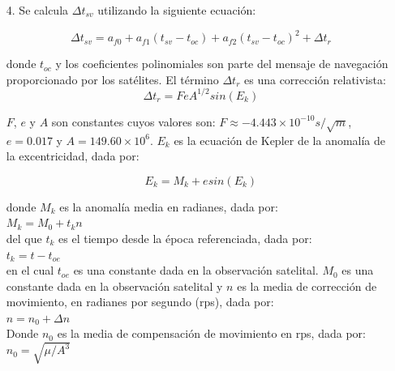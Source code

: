{\begin{itemize}
donde $c$ es la velocidad de la luz: $c \approx 2.998 \times 10^{8} ms^{-1}$.

\item[4.] Se calcula $\Delta t_{sv}$ utilizando la siguiente ecuación:

\begin{equation}
\label{Eq:Deltat_sv}
\Delta t_{sv}= a_{f0} + a_{f1}(t_{sv}-t_{oc}) + a_{f2}(t_{sv}-t_{oc})^2 + \Delta t_{r}
\end{equation}

donde $t_{oc}$ y los coeficientes polinomiales son parte del mensaje de navegación proporcionado por los satélites. El término $\Delta t_{r}$ es una corrección relativista:\\

\begin{equation}
\label{Eq:Deltat_r}
\Delta t_r = FeA^{1/2}sin(E_{k})
\end{equation}

$F$, $e$ y $A$ son constantes cuyos valores son: $F \approx -4.443 \times 10^{-10} s/\sqrt{m}$, $e = 0.017$ y $A = 149.60 \times 10^{6}$. $E_{k}$ es la ecuación de Kepler de la anomalía de la excentricidad, dada por:

\begin{equation}
\label{Eq:Kepler}
E_k = M_k + esin(E_k)
\end{equation}

donde $M_k$ es la anomalía media en radianes, dada por: \\

$M_k = M_0 + t_k n$\\

del que $t_k$ es el tiempo desde la época referenciada, dada por:\\

$t_k = t - t_{oe}$\\

en el cual $t_{oe}$ es una constante dada en la observación satelital. $M_0$ es una constante dada en la observación satelital y $n$ es la media de corrección de movimiento, en radianes por segundo (rps), dada por:\\

$n = n_0 + \Delta n$\\

Donde $n_0$ es la media de compensación de movimiento en rps, dada por:\\

$n_0 = \sqrt{\mu / A^{3}}$\\ 


\end{itemize}}

